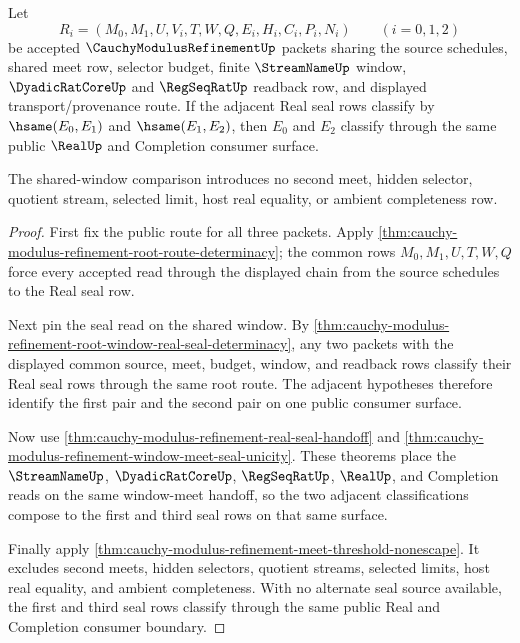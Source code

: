 \begin{theorem}
\label{thm:cauchy-modulus-refinement-shared-window-seal-transitivity}
Let
$$
R_i=(M_0,M_1,U,V_i,T,W,Q,E_i,H_i,C_i,P_i,N_i)
\qquad (i=0,1,2)
$$
be accepted $\CauchyModulusRefinementUp$ packets sharing the source
schedules, shared meet row, selector budget, finite $\StreamNameUp$ window,
$\DyadicRatCoreUp$ and $\RegSeqRatUp$ readback row, and displayed
transport/provenance route. If the adjacent Real seal rows classify by
$\hsame(E_0,E_1)$ and $\hsame(E_1,E_2)$, then $E_0$ and $E_2$ classify
through the same public $\RealUp$ and Completion consumer surface.

The shared-window comparison introduces no second meet, hidden selector,
quotient stream, selected limit, host real equality, or ambient completeness
row.
\end{theorem}
\begin{proof}
First fix the public route for all three packets. Apply
\autoref{thm:cauchy-modulus-refinement-root-route-determinacy}; the common
rows $M_0,M_1,U,T,W,Q$ force every accepted read through the displayed chain
from the source schedules to the Real seal row.

Next pin the seal read on the shared window. By
\autoref{thm:cauchy-modulus-refinement-root-window-real-seal-determinacy}, any
two packets with the displayed common source, meet, budget, window, and
readback rows classify their Real seal rows through the same root route. The
adjacent hypotheses therefore identify the first pair and the second pair on
one public consumer surface.

Now use \autoref{thm:cauchy-modulus-refinement-real-seal-handoff} and
\autoref{thm:cauchy-modulus-refinement-window-meet-seal-unicity}. These
theorems place the $\StreamNameUp$, $\DyadicRatCoreUp$, $\RegSeqRatUp$,
$\RealUp$, and Completion reads on the same window-meet handoff, so the
two adjacent classifications compose to the first and third seal rows on that
same surface.

Finally apply \autoref{thm:cauchy-modulus-refinement-meet-threshold-nonescape}.
It excludes second meets, hidden selectors, quotient streams, selected limits,
host real equality, and ambient completeness. With no alternate seal source
available, the first and third seal rows classify through the same public
Real and Completion consumer boundary.
\end{proof}

